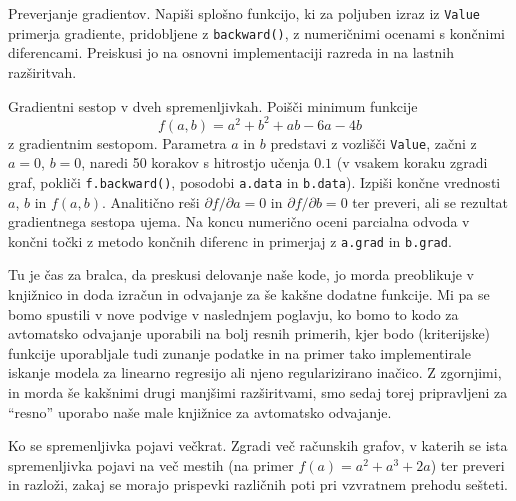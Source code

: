\begin{exercise}{Preverjanje gradientov.}
Napiši splošno funkcijo, ki za poljuben izraz iz \texttt{Value} primerja gradiente, pridobljene z \texttt{backward()}, z numeričnimi ocenami s končnimi diferencami. Preiskusi jo na osnovni implementaciji razreda in na lastnih razširitvah.
\end{exercise}

\begin{exercise}{Gradientni sestop v dveh spremenljivkah.}
Poišči minimum funkcije
\[
f(a,b)=a^2+b^2+ab-6a-4b
\]
z gradientnim sestopom. Parametra $a$ in $b$ predstavi z vozlišči \texttt{Value}, začni z $a=0$, $b=0$, naredi 50 korakov s hitrostjo učenja $0.1$ (v vsakem koraku zgradi graf, pokliči \texttt{f.backward()}, posodobi \texttt{a.data} in \texttt{b.data}). Izpiši končne vrednosti $a$, $b$ in $f(a,b)$. Analitično reši $\partial f/\partial a=0$ in $\partial f/\partial b=0$ ter preveri, ali se rezultat gradientnega sestopa ujema. Na koncu numerično oceni parcialna odvoda v končni točki z metodo končnih diferenc in primerjaj z \texttt{a.grad} in \texttt{b.grad}.
\end{exercise}

Tu je čas za bralca, da preskusi delovanje naše kode, jo morda preoblikuje v knjižnico in doda izračun in odvajanje za še kakšne dodatne funkcije. Mi pa se bomo spustili v nove podvige v naslednjem poglavju, ko bomo to kodo za avtomatsko odvajanje uporabili na bolj resnih primerih, kjer bodo (kriterijske) funkcije uporabljale tudi zunanje podatke in na primer tako implementirale iskanje modela za linearno regresijo ali njeno regularizirano inačico. Z zgornjimi, in morda še kakšnimi drugi manjšimi razširitvami, smo sedaj torej pripravljeni za ``resno'' uporabo naše male knjižnice za avtomatsko odvajanje.

\begin{exercise}{Ko se spremenljivka pojavi večkrat.}
Zgradi več računskih grafov, v katerih se ista spremenljivka pojavi na več mestih (na primer $f(a)=a^2+a^3+2a$) ter preveri in razloži, zakaj se morajo prispevki različnih poti pri vzvratnem prehodu sešteti.
\end{exercise}